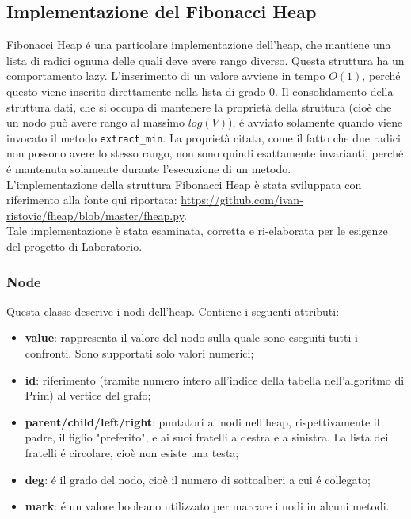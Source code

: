 \subsection{Implementazione del Fibonacci Heap}
Fibonacci Heap é una particolare implementazione dell'heap, che mantiene una lista di radici ognuna delle quali deve avere rango diverso. Questa struttura ha un comportamento lazy. L'inserimento di un valore avviene in tempo $O(1)$, perché questo viene inserito direttamente nella lista di grado 0. Il consolidamento della struttura dati, che si occupa di mantenere la proprietà della struttura (cioè che un nodo può avere rango al massimo $log(V)$), é avviato solamente quando viene invocato il metodo \texttt{extract\_min}. La proprietà citata, come il fatto che due radici non possono avere lo stesso rango, non sono quindi esattamente invarianti, perché é mantenuta solamente durante l'esecuzione di un metodo. \\
L'implementazione della struttura Fibonacci Heap è stata sviluppata con riferimento alla fonte qui riportata: \href{https://github.com/ivan-ristovic/fheap/blob/master/fheap.py}{https://github.com/ivan-ristovic/fheap/blob/master/fheap.py}. \\
Tale implementazione è stata esaminata, corretta e ri-elaborata per le esigenze del progetto di Laboratorio.
\subsubsection{Node}
Questa classe descrive i nodi dell'heap. Contiene i seguenti attributi:
\begin{itemize}
	\item \textbf{value}: rappresenta il valore del nodo sulla quale sono eseguiti tutti i confronti. Sono supportati solo valori numerici;
	\item \textbf{id}: riferimento (tramite numero intero all'indice della tabella nell'algoritmo di Prim) al vertice del grafo;
	\item \textbf{parent/child/left/right}: puntatori ai nodi nell'heap, rispettivamente il padre, il figlio "preferito", e ai suoi fratelli a destra e a sinistra. La lista dei fratelli é circolare, cioè non esiste una testa;
	\item \textbf{deg}: é il grado del nodo, cioè il numero di sottoalberi a cui é collegato;
	\item \textbf{mark}: é un valore booleano utilizzato per marcare i nodi in alcuni metodi.
\end{itemize}
